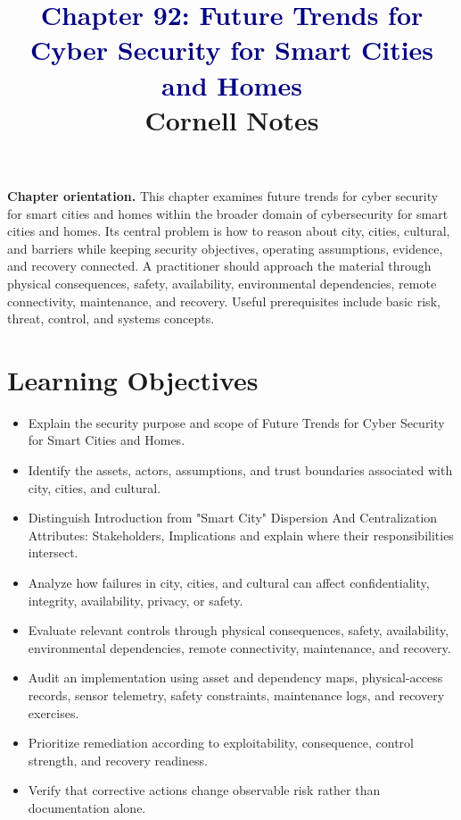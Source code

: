 \documentclass[11pt]{article}
\title{\textcolor{Navy}{Chapter 92: Future Trends for Cyber Security for Smart Cities and Homes}\\[2mm]\large Cornell Notes}
\author{}
\date{}
\begin{document}
\maketitle
\thispagestyle{fancy}
\vspace{-1.5em}
\begin{orientationbox}
\textbf{Chapter orientation.} This chapter examines future trends for cyber security for smart cities and homes within the broader domain of cybersecurity for smart cities and homes. Its central problem is how to reason about city, cities, cultural, and barriers while keeping security objectives, operating assumptions, evidence, and recovery connected. A practitioner should approach the material through physical consequences, safety, availability, environmental dependencies, remote connectivity, maintenance, and recovery. Useful prerequisites include basic risk, threat, control, and systems concepts.
\end{orientationbox}
\section*{Learning Objectives}
\begin{itemize}
\item Explain the security purpose and scope of Future Trends for Cyber Security for Smart Cities and Homes.
\item Identify the assets, actors, assumptions, and trust boundaries associated with city, cities, and cultural.
\item Distinguish Introduction from "Smart City" Dispersion And Centralization Attributes: Stakeholders, Implications and explain where their responsibilities intersect.
\item Analyze how failures in city, cities, and cultural can affect confidentiality, integrity, availability, privacy, or safety.
\item Evaluate relevant controls through physical consequences, safety, availability, environmental dependencies, remote connectivity, maintenance, and recovery.
\item Audit an implementation using asset and dependency maps, physical-access records, sensor telemetry, safety constraints, maintenance logs, and recovery exercises.
\item Prioritize remediation according to exploitability, consequence, control strength, and recovery readiness.
\item Verify that corrective actions change observable risk rather than documentation alone.
\end{itemize}
\end{document}
